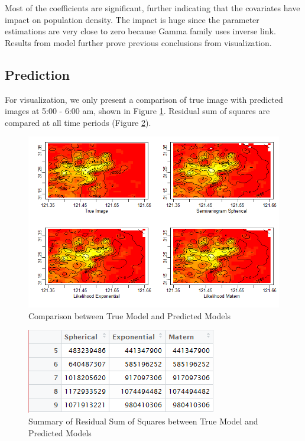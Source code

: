 \documentclass[hidelinks,12pt]{article}
\begin{document}
	Most of the coefficients are significant, further indicating that the covariates have impact on population density. The impact is huge since the parameter estimations are very close to zero because Gamma family uses inverse link. Results from model further prove previous conclusions from visualization.
	
	\subsection{Prediction}
	For visualization, we only present a comparison of true image with predicted images at 5:00 - 6:00 am, shown in Figure \ref{fig:pred5}. Residual sum of squares are compared at all time periods (Figure \ref{fig:predsum}).
	\begin{figure}[!ht]
		\includegraphics[width=\textwidth]{prediction_at_5.png}
		\caption{Comparison between True Model and Predicted Models \label{fig:pred5}}
	\end{figure}
\FloatBarrier
	\begin{figure}[!ht]
		\includegraphics[width=\textwidth]{pred_result_total.png}
		\caption{Summary of Residual Sum of Squares between True Model and Predicted Models \label{fig:predsum}}
	\end{figure}
\FloatBarrier
\end{document}
